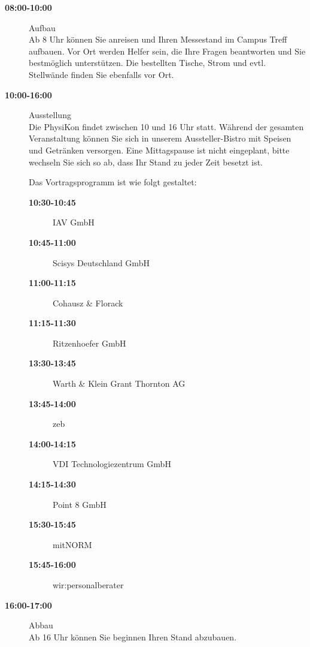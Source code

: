 \documentclass[
  paper=a4,
  fontsize=12pt,
  DIV=16,
  headheight=30pt,
  footheight=45pt,
  headinclude,
  parskip=half,
]{scrartcl}
\begin{document}
\begin{description}
  \item[\textbf{08:00-10:00}] Aufbau\\
    Ab 8 Uhr können Sie anreisen und Ihren Messestand im Campus Treff aufbauen. Vor Ort werden Helfer sein, die Ihre Fragen beantworten und Sie bestmöglich unterstützen. Die bestellten Tische, Strom und evtl. Stellwände finden Sie ebenfalls vor Ort.
  \item[\textbf{10:00-16:00}] Ausstellung\\
    Die PhysiKon findet zwischen 10 und 16 Uhr statt.
    Während der gesamten Veranstaltung können Sie sich in unserem Aussteller-Bistro mit Speisen und Getränken versorgen. Eine Mittagspause ist nicht eingeplant, bitte wechseln Sie sich so ab, dass Ihr Stand zu jeder Zeit besetzt ist.

    Das Vortragsprogramm ist wie folgt gestaltet:
    \begin{description}
      \item[\textbf{10:30-10:45}] IAV GmbH
      \item[\textbf{10:45-11:00}] Scisys Deutschland GmbH
      \item[\textbf{11:00-11:15}] Cohausz \& Florack
      \item[\textbf{11:15-11:30}] Ritzenhoefer GmbH
      \item[ ]
      \item[\textbf{13:30-13:45}] Warth \& Klein Grant Thornton AG
      \item[\textbf{13:45-14:00}] zeb
      \item[\textbf{14:00-14:15}] VDI Technologiezentrum GmbH
      \item[\textbf{14:15-14:30}] Point 8 GmbH
      \item[ ]
      \item[\textbf{15:30-15:45}] mitNORM
      \item[\textbf{15:45-16:00}] wir:personalberater
    \end{description}
  \item[\textbf{16:00-17:00}] Abbau\\
    Ab 16 Uhr können Sie beginnen Ihren Stand abzubauen.
\end{description}
\end{document}

